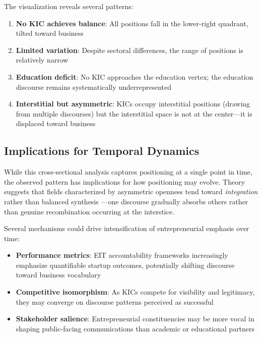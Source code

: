\documentclass[../main.tex]{subfiles}
\begin{document}
The visualization reveals several patterns:

\begin{enumerate}
    \item \textbf{No KIC achieves balance}: All positions fall in the lower-right quadrant, tilted toward business
    \item \textbf{Limited variation}: Despite sectoral differences, the range of positions is relatively narrow
    \item \textbf{Education deficit}: No KIC approaches the education vertex; the education discourse remains systematically underrepresented
    \item \textbf{Interstitial but asymmetric}: KICs occupy interstitial positions (drawing from multiple discourses) but the interstitial space is not at the center---it is displaced toward business
\end{enumerate}

\subsection{Implications for Temporal Dynamics}

While this cross-sectional analysis captures positioning at a single point in time, the observed pattern has implications for how positioning may evolve. Theory suggests that fields characterized by asymmetric openness tend toward \textit{integration} rather than balanced synthesis \cite{oberg2017culture}---one discourse gradually absorbs others rather than genuine recombination occurring at the interstice.

Several mechanisms could drive intensification of entrepreneurial emphasis over time:

\begin{itemize}
    \item \textbf{Performance metrics}: EIT accountability frameworks increasingly emphasize quantifiable startup outcomes, potentially shifting discourse toward business vocabulary
    \item \textbf{Competitive isomorphism}: As KICs compete for visibility and legitimacy, they may converge on discourse patterns perceived as successful
    \item \textbf{Stakeholder salience}: Entrepreneurial constituencies may be more vocal in shaping public-facing communications than academic or educational partners
\end{itemize}
\end{document}
